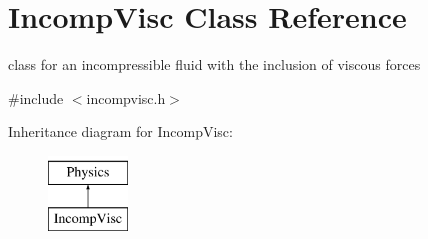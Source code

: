 \hypertarget{classIncompVisc}{\section{\-Incomp\-Visc \-Class \-Reference}
\label{classIncompVisc}
}


class for an incompressible fluid with the inclusion of viscous forces  




{\ttfamily \#include $<$incompvisc.\-h$>$}

\-Inheritance diagram for \-Incomp\-Visc\-:\begin{figure}[H]
\begin{center}
\leavevmode
\includegraphics[height=2.000000cm]{classIncompVisc}
\end{center}
\end{figure}
